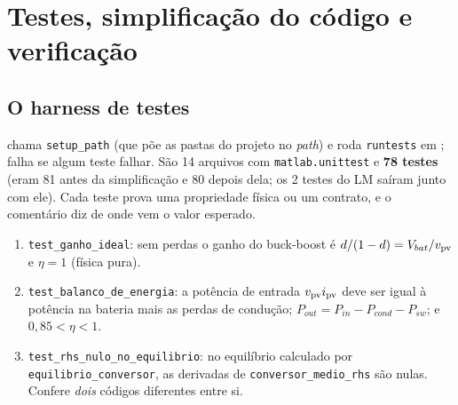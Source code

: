 \section{Testes, simplifica\c{c}\~ao do c\'odigo e verifica\c{c}\~ao}\label{sec:testes}

\subsection{O harness de testes}

 chama \texttt{setup\_path} (que p\~oe as pastas do projeto no \emph{path}) e roda \texttt{runtests} em ; falha se algum teste falhar. S\~ao 14 arquivos
com \texttt{matlab.unittest} e \textbf{78 testes} (eram 81 antes da simplifica\c{c}\~ao e 80 depois dela; os 2 testes do LM sa\'iram junto com ele). Cada teste prova uma propriedade f\'isica ou um contrato, e o coment\'ario diz de onde vem o valor esperado.


\begin{logica}
\begin{enumerate}
\item \texttt{test\_ganho\_ideal}: sem perdas o ganho do buck-boost \'e $d/(1-d)=V_{bat}/v_{\mathrm{pv}}$ e $\eta=1$ (f\'isica pura).
\item \texttt{test\_balanco\_de\_energia}: a pot\^encia de entrada $v_{\mathrm{pv}}i_{\mathrm{pv}}$ deve ser igual \`a pot\^encia na bateria mais as perdas de condu\c{c}\~ao; $P_{out}=P_{in}-P_{cond}-P_{sw}$; e $0{,}85<\eta<1$.
\item \texttt{test\_rhs\_nulo\_no\_equilibrio}: no equil\'ibrio calculado por \texttt{equilibrio\_conversor}, as derivadas de \texttt{conversor\_medio\_rhs} s\~ao nulas. Confere \emph{dois} c\'odigos diferentes entre si.
\end{enumerate}
\end{logica}

